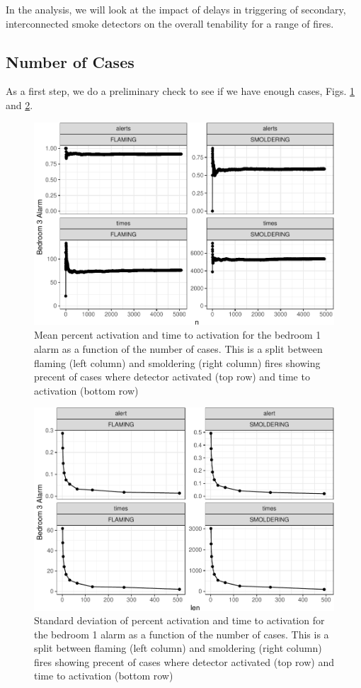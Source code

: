 \documentclass[12pt,twoside]{book}
\begin{document}
In the analysis, we will look at the impact of delays in triggering of secondary, interconnected smoke detectors on the overall tenability for a range of fires.

\hypertarget{number-of-cases}{%
\subsection{Number of Cases}\label{number-of-cases}}

As a first step, we do a preliminary check to see if we have enough cases, Figs. \ref{Ex_2-convergence_of_mean} and \ref{Ex_2-standard_error}.

\begin{figure}[h!]
\centering
\includegraphics[width=4.5in]{FIGURES/converg-1.pdf}
\caption{Mean percent activation and time to activation for the bedroom 1 alarm as a function of the number of cases. This is a split between flaming (left column) and smoldering (right column) fires showing precent of cases where detector activated (top row) and time to activation (bottom row) }
\label{Ex_2-convergence_of_mean}
\end{figure}
\begin{figure}[h!]
\centering
\includegraphics[width=4.5in]{FIGURES/converg-2.pdf}
\caption{Standard deviation of percent activation and time to activation for the bedroom 1 alarm as a function of the number of cases. This is a split between flaming (left column) and smoldering (right column) fires showing precent of cases where detector activated (top row) and time to activation (bottom row) }
\label{Ex_2-standard_error}
\end{figure}
\end{document}
